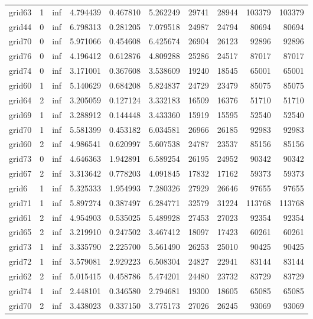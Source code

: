 \begin{longtable}{|l|r|r|r|r|r|r|r|r|r|}
grid63 & 1 & inf & 4.794439 & 0.467810 & 5.262249 & 29741 & 28944 & 103379 & 103379 \\
grid44 & 0 & inf & 6.798313 & 0.281205 & 7.079518 & 24987 & 24794 & 80694 & 80694 \\
grid70 & 0 & inf & 5.971066 & 0.454608 & 6.425674 & 26904 & 26123 & 92896 & 92896 \\
grid76 & 0 & inf & 4.196412 & 0.612876 & 4.809288 & 25286 & 24517 & 87017 & 87017 \\
grid74 & 0 & inf & 3.171001 & 0.367608 & 3.538609 & 19240 & 18545 & 65001 & 65001 \\
grid60 & 1 & inf & 5.140629 & 0.684208 & 5.824837 & 24729 & 23479 & 85075 & 85075 \\
grid64 & 2 & inf & 3.205059 & 0.127124 & 3.332183 & 16509 & 16376 & 51710 & 51710 \\
grid69 & 1 & inf & 3.288912 & 0.144448 & 3.433360 & 15919 & 15595 & 52540 & 52540 \\
grid70 & 1 & inf & 5.581399 & 0.453182 & 6.034581 & 26966 & 26185 & 92983 & 92983 \\
grid60 & 2 & inf & 4.986541 & 0.620997 & 5.607538 & 24787 & 23537 & 85156 & 85156 \\
grid73 & 0 & inf & 4.646363 & 1.942891 & 6.589254 & 26195 & 24952 & 90342 & 90342 \\
grid67 & 2 & inf & 3.313642 & 0.778203 & 4.091845 & 17832 & 17162 & 59373 & 59373 \\
grid6 & 1 & inf & 5.325333 & 1.954993 & 7.280326 & 27929 & 26646 & 97655 & 97655 \\
grid71 & 1 & inf & 5.897274 & 0.387497 & 6.284771 & 32579 & 31224 & 113768 & 113768 \\
grid61 & 2 & inf & 4.954903 & 0.535025 & 5.489928 & 27453 & 27023 & 92354 & 92354 \\
grid65 & 2 & inf & 3.219910 & 0.247502 & 3.467412 & 18097 & 17423 & 60261 & 60261 \\
grid73 & 1 & inf & 3.335790 & 2.225700 & 5.561490 & 26253 & 25010 & 90425 & 90425 \\
grid72 & 1 & inf & 3.579081 & 2.929223 & 6.508304 & 24827 & 22941 & 83144 & 83144 \\
grid62 & 2 & inf & 5.015415 & 0.458786 & 5.474201 & 24480 & 23732 & 83729 & 83729 \\
grid74 & 1 & inf & 2.448101 & 0.346580 & 2.794681 & 19300 & 18605 & 65085 & 65085 \\
grid70 & 2 & inf & 3.438023 & 0.337150 & 3.775173 & 27026 & 26245 & 93069 & 93069 \\

\end{longtable}
